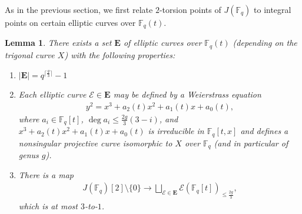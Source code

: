 \documentclass[11pt]{article}
\theoremstyle{plain}
\newtheorem{lemma}[theorem]{Lemma}
\theoremstyle{definition}
\newcommand{\E}{\mathcal{E}}
\begin{document}
As in the previous section, we first relate $2$-torsion points of $J(\mathbb{F}_q)$ to integral points on certain elliptic curves over $\mathbb{F}_q(t)$.
\begin{lemma}
\label{lemma:maintrick2}
There exists a set $\mathbf{E}$ of elliptic curves over $\mathbb{F}_q(t)$ (depending on the trigonal curve $X$) with the following properties:
\begin{enumerate}
\item $|\mathbf{E}|=q^{\lceil \frac{g}{3}\rceil}-1$
\item Each elliptic curve $\E\in \mathbf{E}$ may be defined by a Weierstrass equation 
\begin{align*}
y^2=x^3+a_2(t)x^2+a_1(t)x+a_0(t), 
\end{align*}
where $a_i\in \mathbb{F}_q[t]$, $\deg a_i\leq \frac{2g}{3}(3-i)$, and $x^3+a_2(t)x^2+a_1(t)x+a_0(t)$
 is irreducible in $\mathbb{F}_q[t,x]$ and defines a nonsingular projective curve isomorphic to $X$ over $\mathbb{F}_q$ (and in particular of genus $g$).
\item There is a map
\begin{align*}
J(\mathbb{F}_q)[2]\setminus\{0\}\to \bigsqcup_{\E\in \mathbf{E}} \E(\mathbb{F}_q[t])_{\leq \frac{2g}{3}},
\end{align*}
which is at most $3$-to-$1$.
\label{item:injectivemap}
\end{enumerate}
\end{lemma}
\end{document}
